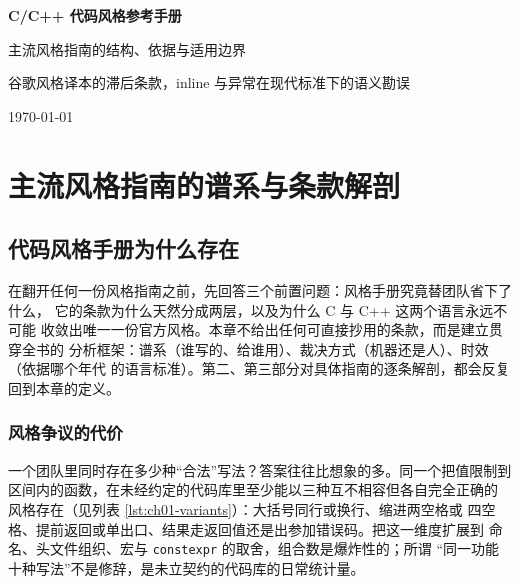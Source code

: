 \documentclass[12pt,a4paper,fontset=fandol]{ctexbook}
\newcommand{\Lang}[1]{\textsf{#1}}
\newcommand{\CL}{\Lang{C}}
\newcommand{\CPP}{\Lang{C++}}
\begin{document}
\frontmatter

\begin{titlepage}
\centering
\vspace*{4cm}
{\Huge\bfseries C/C++ 代码风格参考手册\par}
\vspace{1cm}
{\LARGE 主流风格指南的结构、依据与适用边界\par}
\vspace{0.4cm}
{\Large 谷歌风格译本的滞后条款，inline 与异常在现代标准下的语义勘误\par}
\vfill
{\large \today\par}
\end{titlepage}

\tableofcontents

\mainmatter

\cleardoublepage

\part{主流风格指南的谱系与条款解剖}
\chapter{代码风格手册为什么存在}
\label{ch:ch01-why}

在翻开任何一份风格指南之前，先回答三个前置问题：风格手册究竟替团队省下了什么，
它的条款为什么天然分成两层，以及为什么 \CL{} 与 \CPP{} 这两个语言永远不可能
收敛出唯一一份官方风格。本章不给出任何可直接抄用的条款，而是建立贯穿全书的
分析框架：谱系（谁写的、给谁用）、裁决方式（机器还是人）、时效（依据哪个年代
的语言标准）。第二、第三部分对具体指南的逐条解剖，都会反复回到本章的定义。

\section{风格争议的代价}
\label{sec:ch01-cost}

一个团队里同时存在多少种``合法''写法？答案往往比想象的多。同一个把值限制到
区间内的函数，在未经约定的代码库里至少能以三种互不相容但各自完全正确的
风格存在（见列表 \ref{lst:ch01-variants}）：大括号同行或换行、缩进两空格或
四空格、提前返回或单出口、结果走返回值还是出参加错误码。把这一维度扩展到
命名、头文件组织、宏与 \texttt{constexpr} 的取舍，组合数是爆炸性的；所谓
``同一功能十种写法''不是修辞，是未立契约的代码库的日常统计量。
\end{document}
